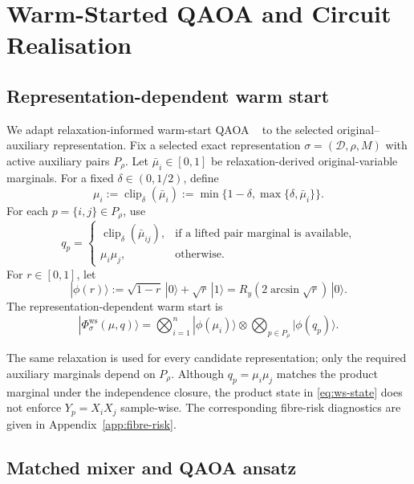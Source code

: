 \documentclass[a4paper,onecolumn,11pt,unpublished]{quantumarticle}
\theoremstyle{remark}
\begin{document}
\section{Warm-Started QAOA and Circuit Realisation}
\label{sec:warm-start}


\subsection{Representation-dependent warm start}
\label{sec:warm-start-state}

We adapt relaxation-informed warm-start QAOA
~\cite{Egger2021,TateSDP2023} to the selected original--auxiliary
representation.
Fix a selected exact representation
$\sigma=(\mathcal D,\rho,M)$ with active auxiliary pairs $P_\rho$.
Let $\bar\mu_i\in[0,1]$ be relaxation-derived original-variable marginals.
For a fixed $\delta\in(0,1/2)$, define
\[
\mu_i:=\operatorname{clip}_\delta(\bar\mu_i)
:=\min\{1-\delta,\max\{\delta,\bar\mu_i\}\}.
\]
For each $p=\{i,j\}\in P_\rho$, use
\[
q_p=
\begin{cases}
\operatorname{clip}_\delta(\bar\mu_{ij}),
& \text{if a lifted pair marginal is available},\\
\mu_i\mu_j,
& \text{otherwise}.
\end{cases}
\]
For $r\in[0,1]$, let
\[
|\phi(r)\rangle
:=
\sqrt{1-r}\,|0\rangle+\sqrt r\,|1\rangle
=
R_y(2\arcsin\sqrt r)\,|0\rangle .
\]
The representation-dependent warm start is
\begin{equation}
|\Phi_\sigma^{\mathrm{ws}}(\mu,q)\rangle
=
\bigotimes_{i=1}^n|\phi(\mu_i)\rangle
\otimes
\bigotimes_{p\in P_\rho}|\phi(q_p)\rangle .
\label{eq:ws-state}
\end{equation}

The same relaxation is used for every candidate representation; only the
required auxiliary marginals depend on $P_\rho$.
Although $q_p=\mu_i\mu_j$ matches the product marginal under the independence
closure, the product state in \eqref{eq:ws-state} does not enforce
$Y_p=X_iX_j$ sample-wise.  The corresponding fibre-risk diagnostics are
given in Appendix~\ref{app:fibre-risk}.

\subsection{Matched mixer and QAOA ansatz}
\label{sec:ws-qaoa}
\end{document}
